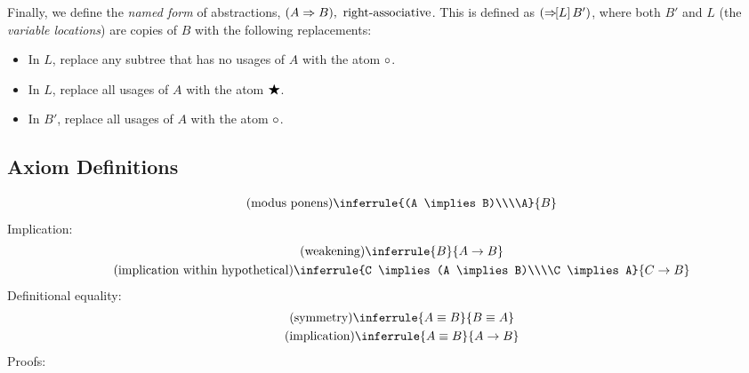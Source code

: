 \documentclass{article}
\begin{document}
  Finally, we define the \emph{named form} of abstractions, $(\nameabstraction{A}B),\ \operatorname{right-associative}$.
  This is defined as $(\Rightarrow\hspace{-0.4em}[L]\,B')$, where both $B'$ and $L$ (the \emph{variable locations}) are copies of $B$ with the following replacements:
  \begin{itemize}
    \item In $L$, replace any subtree that has no usages of $A$ with the atom $\circ$.
    \item In $L$, replace all usages of $A$ with the atom $\bigstar$.
    \item In $B'$, replace all usages of $A$ with the atom $\circ$.
  \end{itemize}

  \subsection{Axiom Definitions}
  \setlength{\jot}{1.4em}
  \begin{gather*}
    \tag{modus ponens}\label{mp}
    \inferrule{(A \implies B)\\\\A}{B}\\
  \end{gather*}
  Implication:
  \begin{gather*}
    \tag{weakening}
    \inferrule{B}{A \implies B}\\
    \tag{implication within hypothetical}
    \inferrule{C \implies (A \implies B)\\\\C \implies A}{C \implies B}\\
  \end{gather*}
  Definitional equality:
  \begin{gather*}
    \tag{symmetry}
    \inferrule{A \equiv B}{B \equiv A}\\
    \tag{implication}
    \inferrule{A \equiv B}{A \implies B}\\
  \end{gather*}
  Proofs:
\end{document}
